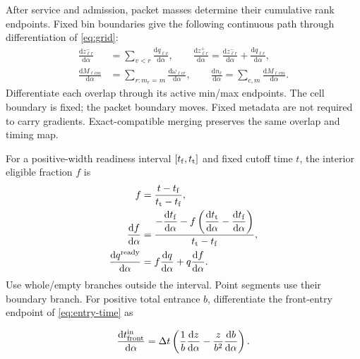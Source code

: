 \documentclass[10pt,a4paper]{article}
\newcommand{\rev}[1]{{\color{revisionred}#1}}
\begin{document}
After service and admission, packet masses determine their cumulative
rank endpoints. Fixed bin boundaries give the following continuous path
through differentiation of \rev{\eqref{eq:grid}}:
\begin{equation}
 \begin{aligned}
 \frac{\mathrm dz^-_{\ell r}}{\mathrm d\alpha}
 &=\sum_{v<r}\frac{\mathrm dq_{\ell v}}{\mathrm d\alpha},\qquad
 \frac{\mathrm dz^+_{\ell r}}{\mathrm d\alpha}
 =\frac{\mathrm dz^-_{\ell r}}{\mathrm d\alpha}
                  +\frac{\mathrm dq_{\ell r}}{\mathrm d\alpha},\\
 \frac{\mathrm dM_{\ell cm}}{\mathrm d\alpha}
 &=\sum_{r:m_r=m}\frac{\mathrm d\omega_{\ell cr}}{\mathrm d\alpha},
 \qquad
 \frac{\mathrm dn_\ell}{\mathrm d\alpha}
 =\sum_{c,m}\frac{\mathrm dM_{\ell cm}}{\mathrm d\alpha}.
 \end{aligned}
 \label{eq:grid-derivative}
\end{equation}
Differentiate each overlap through its active min/max endpoints. The
cell boundary is fixed; the packet boundary moves. Fixed metadata are
not required to carry gradients. Exact-compatible merging preserves the
same overlap and timing map.

For a positive-width readiness interval $[t_{\rm f},t_{\rm t}]$ and
fixed cutoff time $t$, the interior eligible fraction $f$ is
\begin{equation}
 \begin{aligned}
 f&=\frac{t-t_{\rm f}}{t_{\rm t}-t_{\rm f}},\\
 \frac{\mathrm df}{\mathrm d\alpha}
 &=\frac{\displaystyle
 -\frac{\mathrm dt_{\rm f}}{\mathrm d\alpha}
 -f\left(\frac{\mathrm dt_{\rm t}}{\mathrm d\alpha}
                 -\frac{\mathrm dt_{\rm f}}{\mathrm d\alpha}\right)}
 {t_{\rm t}-t_{\rm f}},\\
 \frac{\mathrm dq^{\rm ready}}{\mathrm d\alpha}
 &=f\frac{\mathrm dq}{\mathrm d\alpha}
                       +q\frac{\mathrm df}{\mathrm d\alpha}.
 \end{aligned}
 \label{eq:eligibility-derivative}
\end{equation}
Use whole/empty branches outside the interval. Point segments use their
boundary branch. For positive total entrance $b$, differentiate the
\rev{front-entry endpoint} of \rev{\eqref{eq:entry-time}} as

\begin{equation}
 \frac{\mathrm dt^{\rm in}_{\rm front}}{\mathrm d\alpha}
 =\Delta t\left(\frac1b\frac{\mathrm dz}{\mathrm d\alpha}
       -\frac z{b^2}\frac{\mathrm db}{\mathrm d\alpha}\right).
 \label{eq:entry-derivative}
\end{equation}
\end{document}
